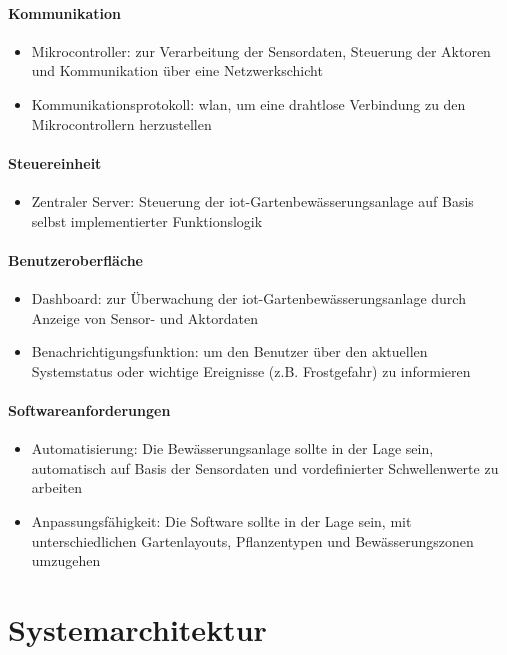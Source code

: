 \paragraph{Kommunikation}
\begin{itemize}
  \item Mikrocontroller: zur Verarbeitung der Sensordaten, Steuerung der Aktoren und Kommunikation über eine Netzwerkschicht
  \item Kommunikationsprotokoll: \gls{wlan}, um eine drahtlose Verbindung zu den Mikrocontrollern herzustellen
\end{itemize}

\paragraph{Steuereinheit}
\begin{itemize}
  \item Zentraler Server: Steuerung der \gls{iot}-Gartenbewässerungsanlage auf Basis selbst implementierter Funktionslogik
\end{itemize}

\paragraph{Benutzeroberfläche}
\begin{itemize}
  \item Dashboard: zur Überwachung der \gls{iot}-Gartenbewässerungsanlage durch Anzeige von Sensor- und Aktordaten
  \item Benachrichtigungsfunktion: um den Benutzer über den aktuellen Systemstatus oder wichtige Ereignisse (z.B. Frostgefahr) zu informieren
\end{itemize}

\paragraph{Softwareanforderungen}
\begin{itemize}
  \item Automatisierung: Die Bewässerungsanlage sollte in der Lage sein, automatisch auf Basis der Sensordaten und vordefinierter Schwellenwerte zu arbeiten
  \item Anpassungsfähigkeit: Die Software sollte in der Lage sein, mit unterschiedlichen Gartenlayouts, Pflanzentypen und Bewässerungszonen umzugehen
\end{itemize}


\section{Systemarchitektur} \label{sec:architektur}

